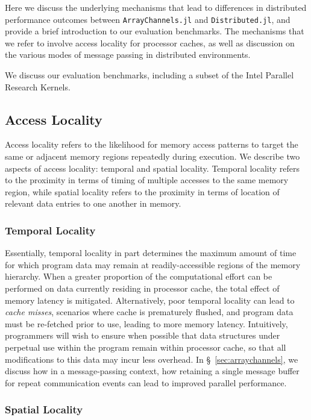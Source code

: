 Here we discuss the underlying mechanisms that lead to differences in
distributed performance outcomes between \texttt{ArrayChannels.jl} and
\texttt{Distributed.jl}, and provide a brief introduction to our
evaluation benchmarks. The mechanisms that we refer to involve access
locality for processor caches, as well as discussion on the various
modes of message passing in distributed environments.

We discuss our evaluation benchmarks, including a subset of the Intel
Parallel Research Kernels.

\subsection{Access Locality}
\label{sec:access-locality}

Access locality \cite{patterns} refers to the likelihood for memory access patterns to target the same or adjacent memory regions repeatedly during execution. We describe two aspects of access locality: temporal and spatial locality. Temporal locality refers to the proximity in terms of timing of multiple accesses to the same memory region, while spatial locality
refers to the proximity in terms of location of relevant data entries to one another in memory.

\subsubsection{Temporal Locality}
\label{sec:temporal-locality}

Essentially, temporal locality in part determines the maximum amount of
time for which program data may remain at readily-accessible regions of
the memory hierarchy. When a greater proportion of the computational
effort can be performed on data currently residing in processor cache,
the total effect of memory latency is mitigated. Alternatively, poor
temporal locality can lead to \emph{cache misses}, scenarios where cache
is prematurely flushed, and program data must be re-fetched prior to use,
leading to more memory latency. Intuitively, programmers will wish to
ensure when possible that data structures under perpetual use within the
program remain within processor cache, so that all modifications to this
data may incur less overhead. In \S~\ref{sec:arraychannels}, we
discuss how in a message-passing context, how retaining a single message
buffer for repeat communication events can lead to improved parallel
performance.

\subsubsection{Spatial Locality}
\label{sec:spatial-locality}

